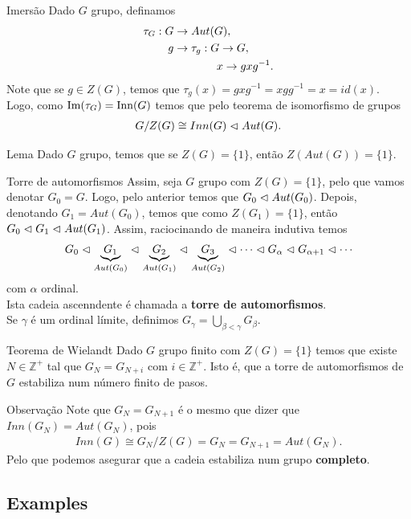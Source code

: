 \begin{frame}{}
  \begin{block}{Imersão}
    Dado $G$ grupo, definamos
    \begin{align*}
      \tau_{G}:G&\to Aut(G),\\
               g&\to \tau_{g}:G\to G,\\
               \phantom{g}&\hspace{1.35cm} x\to gxg^{-1}.
    \end{align*}
    Note que se $g\in Z(G)$, temos que $\tau_g(x)=gxg^{-1}=xgg^{-1}=x=id(x)$.\\
    Logo, como $\operatorname{Im}(\tau_{G})=\operatorname{Inn}(G)$ temos que pelo teorema de isomorfismo de grupos
    \begin{align*}
      G/Z(G)\cong Inn(G)\vartriangleleft Aut(G).
    \end{align*}
  \end{block}
\end{frame}
\begin{frame}{}
  \begin{block}{Lema}
    Dado $G$ grupo, temos que se $Z(G)=\{1\}$, então $Z(Aut(G))=\{1\}$. 
  \end{block}
  \begin{block}{Torre de automorfismos}
    Assim, seja $G$ grupo com $Z(G)=\{1\}$, pelo que vamos denotar $G_0=G$. Logo, pelo anterior temos que $G_0\vartriangleleft Aut(G_0)$. Depois, denotando $G_1=Aut(G_0)$, temos que como $Z(G_1)=\{1\}$, então $G_0\vartriangleleft G_1\vartriangleleft Aut(G_1)$. Assim, raciocinando de maneira indutiva temos
    \begin{align*}
      G_0\vartriangleleft \underbrace{G_1}_{Aut(G_0)}\vartriangleleft \underbrace{G_2}_{Aut(G_1)}\vartriangleleft \underbrace{G_3}_{Aut(G_2)}\vartriangleleft\cdots\vartriangleleft G_{\alpha}\vartriangleleft G_{\alpha+1}\vartriangleleft\cdots
    \end{align*}
    com $\alpha$ ordinal.\\
    Ista cadeia ascenndente é chamada a \textbf{torre de automorfismos}.\\
    Se $\gamma$ é um ordinal límite, definimos $G_{\gamma}=\bigcup_{\beta<\gamma}G_{\beta}$. 
  \end{block}
\end{frame}
\begin{frame}{}
  \begin{block}{Teorema de Wielandt}
    Dado $G$ grupo finito com $Z(G)=\{1\}$ temos que existe $N\in\mathbb{Z}^{+}$ tal que $G_{N}=G_{N+i}$ com $i\in\mathbb{Z}^{+}$. Isto é, que a torre de automorfismos de $G$ estabiliza num número finito de pasos. 
  \end{block}
  \begin{block}{Observação}
    Note que $G_{N}=G_{N+1}$ é o mesmo que dizer que $Inn(G_N)=Aut(G_{N})$, pois
    \begin{align*}
      Inn(G)\cong G_N/Z(G)=G_N=G_{N+1}=Aut(G_N).
    \end{align*}
    Pelo que podemos asegurar que a cadeia estabiliza num grupo \textbf{completo}.
  \end{block}
\end{frame}
\subsection{Examples}

